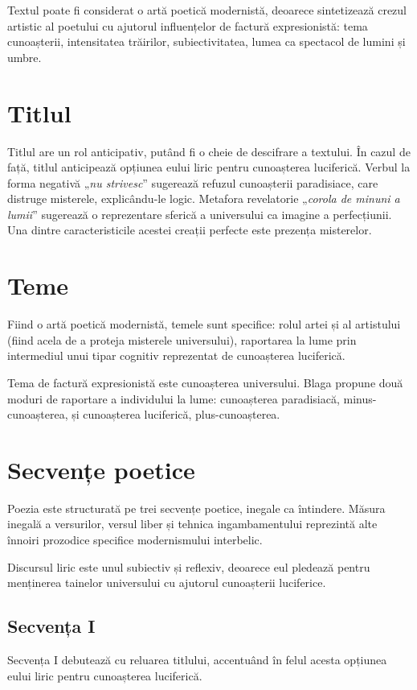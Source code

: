 \documentclass{article}
\newcommand{\qu}[1]{„\emph{#1}”}
\begin{document}
Textul poate fi considerat o artă poetică modernistă, deoarece sintetizează crezul artistic al poetului cu ajutorul influențelor de factură expresionistă: tema cunoașterii, intensitatea trăirilor, subiectivitatea, lumea ca spectacol de lumini și umbre.

\section{Titlul}
Titlul are un rol anticipativ, putând fi o cheie de descifrare a textului. În cazul de față, titlul anticipează opțiunea eului liric pentru cunoașterea luciferică. Verbul la forma negativă \qu{nu strivesc} sugerează refuzul cunoașterii paradisiace, care distruge misterele, explicându-le logic. Metafora revelatorie \qu{corola de minuni a lumii} sugerează o reprezentare sferică a universului ca imagine a perfecțiunii. Una dintre caracteristicile acestei creații perfecte este prezența misterelor.

\section{Teme}
Fiind o artă poetică modernistă, temele sunt specifice: rolul artei și al artistului (fiind acela de a proteja misterele universului), raportarea la lume prin intermediul unui tipar cognitiv reprezentat de cunoașterea luciferică.

Tema de factură expresionistă este cunoașterea universului. Blaga propune două moduri de raportare a individului la lume: cunoașterea paradisiacă, minus-cunoașterea, și cunoașterea luciferică, plus-cunoașterea.

\section{Secvențe poetice}
Poezia este structurată pe trei secvențe poetice, inegale ca întindere. Măsura inegală a versurilor, versul liber și tehnica ingambamentului reprezintă alte înnoiri prozodice specifice modernismului interbelic.

Discursul liric este unul subiectiv și reflexiv, deoarece eul pledează pentru menținerea tainelor universului cu ajutorul cunoașterii luciferice.

\subsection{Secvența I}
Secvența I debutează cu reluarea titlului, accentuând în felul acesta opțiunea eului liric pentru cunoașterea luciferică.
\end{document}
